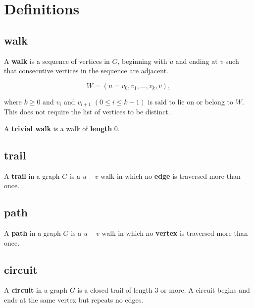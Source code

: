\documentclass{article}
\begin{document}
\section*{Definitions}

\subsection*{walk}

A \textbf{walk} is a sequence of vertices in $G$, beginning with $u$ and ending at $v$ such that consecutive vertices in the sequence are adjacent.

$$ W=(u =v_0, v_1, ..., v_k, v),$$

where $k \ge 0$ and $v_i$ and $v_{i+1}$ $(0 \le i \le k - 1)$ is said to lie on or belong to $W$.
This does not require the list of vertices to be distinct.

A \textbf{trivial walk} is a walk of \textbf{length} 0.

\subsection*{trail}

A \textbf{trail} in a graph $G$ is a $u-v$ walk in which no \textbf{edge} is traversed more than once.

\subsection*{path}

A \textbf{path} in a graph $G$ is a $u-v$ walk in which no \textbf{vertex} is traversed more than once.

\subsection*{circuit}

A \textbf{circuit} in a graph $G$ is a closed trail of length 3 or more.
A circuit begins and ends at the same vertex but repeats no edges.
\end{document}
